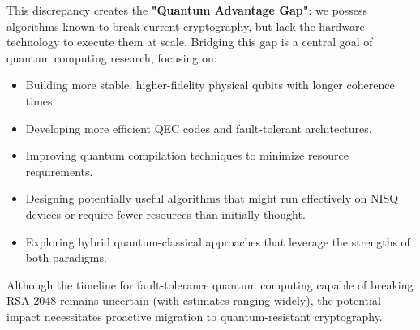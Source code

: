 This discrepancy creates the \textbf{"Quantum Advantage Gap"}: we possess algorithms known to break current cryptography, but lack the hardware technology to execute them at scale. Bridging this gap is a central goal of quantum computing research, focusing on:
\begin{itemize}
    \item Building more stable, higher-fidelity physical qubits with longer coherence times.
    \item Developing more efficient QEC codes and fault-tolerant architectures.
    \item Improving quantum compilation techniques to minimize resource requirements.
    \item Designing potentially useful algorithms that might run effectively on NISQ devices or require fewer resources than initially thought.
    \item Exploring hybrid quantum-classical approaches that leverage the strengths of both paradigms.
\end{itemize}
Although the timeline for \gls{fault-tolerance} quantum computing capable of breaking RSA-2048 remains uncertain (with estimates ranging widely), the potential impact necessitates proactive migration to quantum-resistant cryptography.